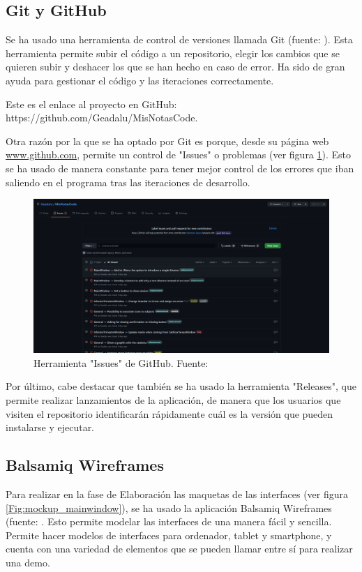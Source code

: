 \subsection{Git y GitHub}
Se ha usado una herramienta de control de versiones llamada Git (fuente: \cite{git}). Esta herramienta permite subir el código a un repositorio, elegir los cambios que se quieren subir y deshacer los que se han hecho en caso de error. Ha sido de gran ayuda para gestionar el código y las iteraciones correctamente.

Este es el enlace al proyecto en GitHub: https://github.com/Geadalu/MisNotasCode.

Otra razón por la que se ha optado por Git es porque, desde su página web \url{www.github.com}, permite un control de "Issues" o problemas (ver figura \ref{Fig:issues_github}). Esto se ha usado de manera constante para tener mejor control de los errores que iban saliendo en el programa tras las iteraciones de desarrollo.

\begin{figure}[h]
\centering\includegraphics[width=1\linewidth]{figs/github.png}
\caption{Herramienta "Issues" de GitHub. Fuente: \cite{github}}
\label{Fig:issues_github}
\end{figure}

Por último, cabe destacar que también se ha usado la herramienta "Releases", que permite realizar lanzamientos de la aplicación, de manera que los usuarios que visiten el repositorio identificarán rápidamente cuál es la versión que pueden instalarse y ejecutar.


\subsection{Balsamiq Wireframes}
\label{sub:balsamiq}
Para realizar en la fase de Elaboración las maquetas de las interfaces (ver figura \ref{Fig:mockup_mainwindow}), se ha usado la aplicación Balsamiq Wireframes (fuente: \cite{balsamiq}. Esto permite modelar las interfaces de una manera fácil y sencilla. Permite hacer modelos de interfaces para ordenador, tablet y smartphone, y cuenta con una variedad de elementos que se pueden llamar entre sí para realizar una demo.

